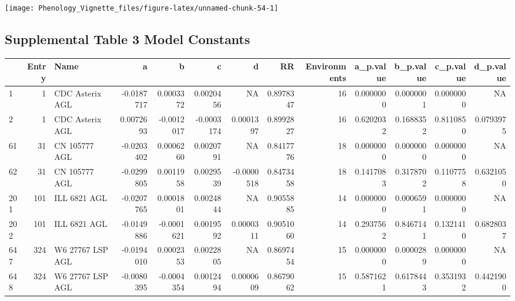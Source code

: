 \documentclass[
]{article}
\newenvironment{Shaded}{\begin{snugshade}}{\end{snugshade}}
\newcommand{\CommentTok}[1]{\textcolor[rgb]{0.56,0.35,0.01}{\textit{#1}}}
\newcommand{\DataTypeTok}[1]{\textcolor[rgb]{0.13,0.29,0.53}{#1}}
\newcommand{\KeywordTok}[1]{\textcolor[rgb]{0.13,0.29,0.53}{\textbf{#1}}}
\newcommand{\NormalTok}[1]{#1}
\newcommand{\OperatorTok}[1]{\textcolor[rgb]{0.81,0.36,0.00}{\textbf{#1}}}
\newcommand{\StringTok}[1]{\textcolor[rgb]{0.31,0.60,0.02}{#1}}
\begin{document}
\texttt{[image: Phenology\_Vignette\_files/figure-latex/unnamed-chunk-54-1]}

\hypertarget{supplemental-table-3-model-constants}{%
\subsection{Supplemental Table 3 Model
Constants}\label{supplemental-table-3-model-constants}}

\begin{Shaded}
\end{Shaded}

\begin{longtable}[]{@{}lrlrrrrrrrrrr@{}}
\toprule
& Entry & Name & a & b & c & d & RR & Environments & a\_p.value &
b\_p.value & c\_p.value & d\_p.value\tabularnewline
\midrule
\endhead
1 & 1 & CDC Asterix AGL & -0.0187717 & 0.0003372 & 0.0020456 & NA &
0.8978347 & 16 & 0.0000000 & 0.0000001 & 0.0000000 & NA\tabularnewline
2 & 1 & CDC Asterix AGL & 0.0072693 & -0.0012017 & -0.0003174 &
0.0001397 & 0.8992827 & 16 & 0.6202032 & 0.1688352 & 0.8110850 &
0.0793975\tabularnewline
61 & 31 & CN 105777 AGL & -0.0203402 & 0.0006260 & 0.0020791 & NA &
0.8417776 & 18 & 0.0000000 & 0.0000000 & 0.0000000 & NA\tabularnewline
62 & 31 & CN 105777 AGL & -0.0299805 & 0.0011958 & 0.0029539 &
-0.0000518 & 0.8473458 & 18 & 0.1417083 & 0.3178702 & 0.1107758 &
0.6321050\tabularnewline
201 & 101 & ILL 6821 AGL & -0.0207765 & 0.0001801 & 0.0024844 & NA &
0.9055885 & 14 & 0.0000000 & 0.0006591 & 0.0000000 & NA\tabularnewline
202 & 101 & ILL 6821 AGL & -0.0149886 & -0.0001621 & 0.0019592 &
0.0000311 & 0.9051060 & 14 & 0.2937562 & 0.8467141 & 0.1321410 &
0.6828037\tabularnewline
647 & 324 & W6 27767 LSP AGL & -0.0194010 & 0.0002353 & 0.0022805 & NA &
0.8697454 & 15 & 0.0000000 & 0.0000289 & 0.0000000 & NA\tabularnewline
648 & 324 & W6 27767 LSP AGL & -0.0080395 & -0.0004354 & 0.0012494 &
0.0000609 & 0.8679062 & 15 & 0.5871621 & 0.6178443 & 0.3531932 &
0.4421900\tabularnewline
\bottomrule
\end{longtable}
\end{document}
